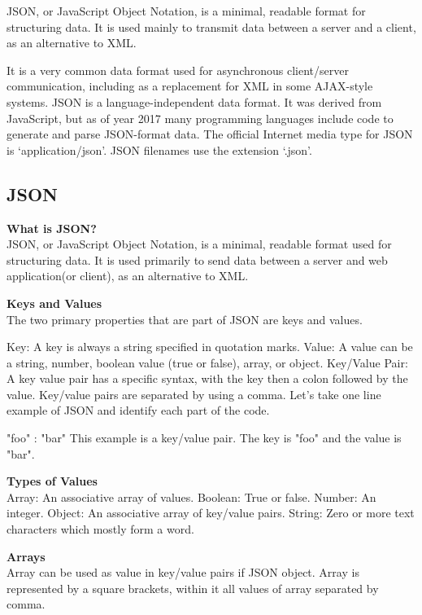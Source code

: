 \hspace*{0.2in}JSON, or JavaScript Object Notation, is a minimal, readable format for structuring data. It is used mainly to transmit data between a server and a client, as an alternative to XML. 
		
\hspace*{0.2in}It is a very common data format used for asynchronous client/server communication, including as a replacement for XML in some AJAX-style systems. JSON is a language-independent data format. It was derived from JavaScript, but as of year 2017 many programming languages include code to generate and parse JSON-format data. The official Internet media type for JSON is `application/json'. JSON filenames use the extension `.json'.


\subsection{JSON}

\textbf{What is JSON?}\\
\hspace*{0.2in}JSON, or JavaScript Object Notation, is a minimal, readable format used for structuring data. It is used primarily to send data between a server and web application(or client), as an alternative to XML. 

\textbf{Keys and Values}\\

The two primary properties that are part of JSON are keys and values. 

Key: A key is always a string specified in quotation marks.
Value: A value can be a string, number, boolean value (true or false), array, or object.
Key/Value Pair: A key value pair has a specific syntax, with the key then a colon followed by the value. Key/value pairs are separated by using a comma.
Let's take one line example of JSON and identify each part of the code.

"foo" : "bar"
This example is a key/value pair. The key is "foo" and the value is "bar".

\textbf{Types of Values}\\

Array: An associative array of values.
Boolean: True or false.
Number: An integer.
Object: An associative array of key/value pairs.
String: Zero or more text characters which mostly form a word.

\textbf{Arrays}\\

Array can be used as value in key/value pairs if JSON object. Array is represented by a square brackets, within it all values of array separated by comma.

